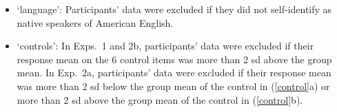 \documentclass[11pt,fleqn]{article}
\newcommand{\jt}[1]{\textbf{\color{blue}JT: #1}}
\newcommand{\6}{\mbox{$[\hspace*{-.6mm}[$}}
\newcommand{\9}{\mbox{$]\hspace*{-.6mm}]$}}
\begin{document}
\begin{itemize}[topsep = -1ex,itemsep=-2pt]


\item `language': Participants' data were excluded if they did not self-identify as native speakers of American English.

\item `controls': In Exps.~1 and 2b, participants' data were excluded if their response mean on the 6 control items was more than 2 sd above the group mean. In Exp.~2a, participants' data were excluded if their response mean was more than 2 sd below the group mean of the control in (\ref{control}a) or more than 2 sd above the group mean of the control in (\ref{control}b).


\end{itemize}


\end{document}
